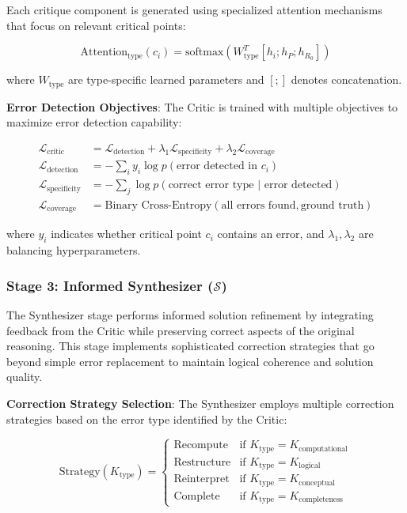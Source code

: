 \documentclass[10pt,twocolumn]{article}
\newcommand{\Synthesizer}{\mathcal{S}}
\begin{document}
Each critique component is generated using specialized attention mechanisms that focus on relevant critical points:

\begin{equation}
\text{Attention}_{\text{type}}(c_i) = \text{softmax}(W_{\text{type}}^T [h_i; h_P; h_{R_0}])
\end{equation}

where $W_{\text{type}}$ are type-specific learned parameters and $[; ]$ denotes concatenation.

\textbf{Error Detection Objectives}: The Critic is trained with multiple objectives to maximize error detection capability:

\begin{align}
\mathcal{L}_{\text{critic}} &= \mathcal{L}_{\text{detection}} + \lambda_1 \mathcal{L}_{\text{specificity}} + \lambda_2 \mathcal{L}_{\text{coverage}} \\
\mathcal{L}_{\text{detection}} &= -\sum_{i} y_i \log p(\text{error detected in } c_i) \\
\mathcal{L}_{\text{specificity}} &= -\sum_{j} \log p(\text{correct error type } | \text{ error detected}) \\
\mathcal{L}_{\text{coverage}} &= \text{Binary Cross-Entropy}(\text{all errors found}, \text{ground truth})
\end{align}

where $y_i$ indicates whether critical point $c_i$ contains an error, and $\lambda_1, \lambda_2$ are balancing hyperparameters.

\subsubsection{Stage 3: Informed Synthesizer ($\Synthesizer$)}

The Synthesizer stage performs informed solution refinement by integrating feedback from the Critic while preserving correct aspects of the original reasoning. This stage implements sophisticated correction strategies that go beyond simple error replacement to maintain logical coherence and solution quality.

\textbf{Correction Strategy Selection}: The Synthesizer employs multiple correction strategies based on the error type identified by the Critic:

\begin{equation}
\text{Strategy}(K_{\text{type}}) = \begin{cases}
\text{Recompute} & \text{if } K_{\text{type}} = K_{\text{computational}} \\
\text{Restructure} & \text{if } K_{\text{type}} = K_{\text{logical}} \\
\text{Reinterpret} & \text{if } K_{\text{type}} = K_{\text{conceptual}} \\
\text{Complete} & \text{if } K_{\text{type}} = K_{\text{completeness}}
\end{cases}
\end{equation}
\end{document}
